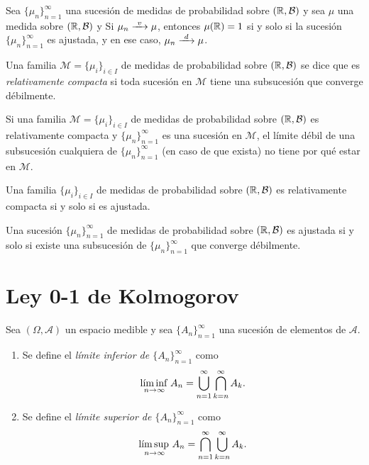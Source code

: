 \documentclass[a4paper, 11pt, extrafontsizes]{memoir}
\begin{document}
    \begin{theorem}
        Sea $\{\mu_n\}_{n=1}^\infty$ una sucesión de medidas de probabilidad sobre $(\R,\mathcal{B})$ y sea $\mu$ una medida sobre $(\R,\mathcal{B})$ y  Si $\mu_n \vconv \mu$, entonces $\mu(\R) = 1$ si y solo si la sucesión $\{\mu_n\}_{n=1}^\infty$ es ajustada, y en ese caso, $\mu_n \dconv \mu$.
    \end{theorem}

    \begin{definition}
        Una familia $\mathcal{M} = \{\mu_i\}_{i \in I}$ de medidas de probabilidad sobre $(\R,\mathcal{B})$ se dice que es \emph{relativamente compacta} si toda sucesión en $\mathcal{M}$ tiene una subsucesión que converge débilmente.
    \end{definition}

    Si una familia $\mathcal{M} = \{\mu_i\}_{i \in I}$ de medidas de probabilidad sobre $(\R,\mathcal{B})$ es relativamente compacta y $\{\mu_n\}_{n=1}^\infty$ es una sucesión en $\mathcal{M}$, el límite débil de una subsucesión cualquiera de $\{\mu_n\}_{n=1}^\infty$ (en caso de que exista) no tiene por qué estar en $\mathcal{M}$.

    \begin{theorem}
        Una familia $\{\mu_i\}_{i \in I}$ de medidas de probabilidad sobre $(\R,\mathcal{B})$ es relativamente compacta si y solo si es ajustada.
    \end{theorem}

    \begin{corollary}
        Una sucesión $\{\mu_n\}_{n=1}^\infty$ de medidas de probabilidad sobre $(\R,\mathcal{B})$ es ajustada si y solo si existe una subsucesión de $\{\mu_n\}_{n=1}^\infty$ que converge débilmente.
    \end{corollary}

\section{Ley 0-1 de Kolmogorov}

\begin{definition}
    Sea $(\Omega,\mathcal{A})$ un espacio medible y sea $\{A_n\}_{n=1}^\infty$ una sucesión de elementos de $\mathcal{A}$.
    \begin{enumerate}
        \item Se define el \emph{límite inferior de $\{A_n\}_{n=1}^\infty$} como
        \[\linf_{n \to \infty} A_n = \bigcup_{n=1\vphantom{k}}^\infty \bigcap_{k=n}^\infty A_k.\]
        \item Se define el \emph{límite superior de $\{A_n\}_{n=1}^\infty$} como
        \[\lsup_{n \to \infty} A_n = \bigcap_{n=1\vphantom{k}}^\infty \bigcup_{k=n}^\infty A_k.\]
    \end{enumerate}
\end{definition}
\end{document}
